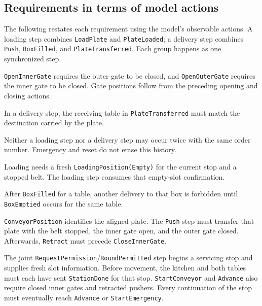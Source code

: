 \documentclass[11pt,a4paper]{article}
\begin{document}
\subsection*{Requirements in terms of model actions}

The following restates each requirement using the model's observable actions. A loading step combines \texttt{LoadPlate} and \texttt{PlateLoaded}; a delivery step combines \texttt{Push}, \texttt{BoxFilled}, and \texttt{PlateTransferred}. Each group happens as one synchronized step.

\begin{description}[leftmargin=3em,labelwidth=2.5em,labelsep=0.5em,itemsep=0.4em]
  \item[\ref{req:r1}] \texttt{OpenInnerGate} requires the outer gate to be closed, and \texttt{OpenOuterGate} requires the inner gate to be closed. Gate positions follow from the preceding opening and closing actions.

  \item[\ref{req:r2}] In a delivery step, the receiving table in \texttt{PlateTransferred} must match the destination carried by the plate.

  \item[\ref{req:r3}] Neither a loading step nor a delivery step may occur twice with the same order number. Emergency and reset do not erase this history.

  \item[\ref{req:r4}] Loading needs a fresh \texttt{LoadingPosition(Empty)} for the current stop and a stopped belt. The loading step consumes that empty-slot confirmation.

  \item[\ref{req:r5}] After \texttt{BoxFilled} for a table, another delivery to that box is forbidden until \texttt{BoxEmptied} occurs for the same table.

  \item[\ref{req:r6}] \texttt{ConveyorPosition} identifies the aligned plate. The \texttt{Push} step must transfer that plate with the belt stopped, the inner gate open, and the outer gate closed. Afterwards, \texttt{Retract} must precede \texttt{CloseInnerGate}.

  \item[\ref{req:r7}] The joint \texttt{RequestPermission}/\texttt{RoundPermitted} step begins a servicing stop and supplies fresh slot information. Before movement, the kitchen and both tables must each have sent \texttt{StationDone} for that stop. \texttt{StartConveyor} and \texttt{Advance} also require closed inner gates and retracted pushers. Every continuation of the stop must eventually reach \texttt{Advance} or \texttt{StartEmergency}.


\end{description}
\end{document}
